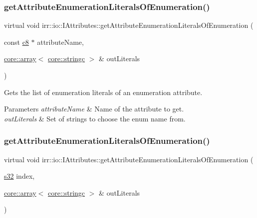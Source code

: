 \subsubsection{\texorpdfstring{get\+Attribute\+Enumeration\+Literals\+Of\+Enumeration()}{getAttributeEnumerationLiteralsOfEnumeration()}\hspace{0.1cm}{\footnotesize\ttfamily [2/4]}}
{\footnotesize\ttfamily virtual void irr\+::io\+::\+I\+Attributes\+::get\+Attribute\+Enumeration\+Literals\+Of\+Enumeration (\begin{DoxyParamCaption}\item[{const \hyperlink{namespaceirr_a9395eaea339bcb546b319e9c96bf7410}{c8} $\ast$}]{attribute\+Name,  }\item[{\hyperlink{classirr_1_1core_1_1array}{core\+::array}$<$ \hyperlink{namespaceirr_1_1core_ab26a0e0359206b5a694f35c37c829d7f}{core\+::stringc} $>$ \&}]{out\+Literals }\end{DoxyParamCaption})\hspace{0.3cm}{\ttfamily [pure virtual]}}



Gets the list of enumeration literals of an enumeration attribute. 


\begin{DoxyParams}{Parameters}
{\em attribute\+Name} & Name of the attribute to get. \\
\hline
{\em out\+Literals} & Set of strings to choose the enum name from. \\
\hline
\end{DoxyParams}
\mbox{\label{classirr_1_1io_1_1IAttributes_ae5d5d0c42a5a0199baf12abe971cb610}} 
\subsubsection{\texorpdfstring{get\+Attribute\+Enumeration\+Literals\+Of\+Enumeration()}{getAttributeEnumerationLiteralsOfEnumeration()}\hspace{0.1cm}{\footnotesize\ttfamily [3/4]}}
{\footnotesize\ttfamily virtual void irr\+::io\+::\+I\+Attributes\+::get\+Attribute\+Enumeration\+Literals\+Of\+Enumeration (\begin{DoxyParamCaption}\item[{\hyperlink{namespaceirr_ac66849b7a6ed16e30ebede579f9b47c6}{s32}}]{index,  }\item[{\hyperlink{classirr_1_1core_1_1array}{core\+::array}$<$ \hyperlink{namespaceirr_1_1core_ab26a0e0359206b5a694f35c37c829d7f}{core\+::stringc} $>$ \&}]{out\+Literals }\end{DoxyParamCaption})\hspace{0.3cm}{\ttfamily [pure virtual]}}



